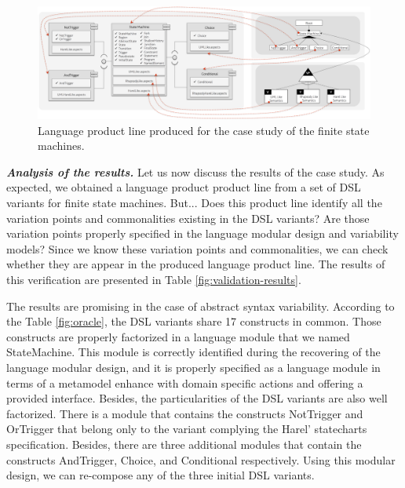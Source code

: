 
\begin{figure}
\centering
\includegraphics[width=1\linewidth]{images/results-casestudy.png}
\caption{Language product line produced for the case study of the finite state machines. }
\label{fig:results-casestudy}
\end{figure}

\vspace{2mm}
\textbf{\textit{Analysis of the results.}} Let us now discuss the results of the case study. As expected, we obtained a language product product line from a set of DSL variants for finite state machines. But... Does this product line identify all the variation points and commonalities existing in the DSL variants? Are those variation points properly specified in the language modular design and variability models? Since we know these variation points and commonalities, we can check whether they are appear in the produced language product line. The results of this verification are presented in Table \ref{fig:validation-results}.

The results are promising in the case of abstract syntax variability. According to the Table \ref{fig:oracle}, the DSL variants share 17 constructs in common. Those constructs are properly factorized in a language module that we named StateMachine. This module is correctly identified during the recovering of the language modular design, and it is properly specified as a language module in terms of a metamodel enhance with domain specific actions and offering a provided interface. Besides, the particularities of the DSL variants are also well factorized. There is a module that contains the constructs NotTrigger and OrTrigger that belong only to the variant complying the Harel' statecharts specification. Besides, there are three additional modules that contain the constructs AndTrigger, Choice, and Conditional respectively. Using this modular design, we can re-compose any of the three initial DSL variants.

